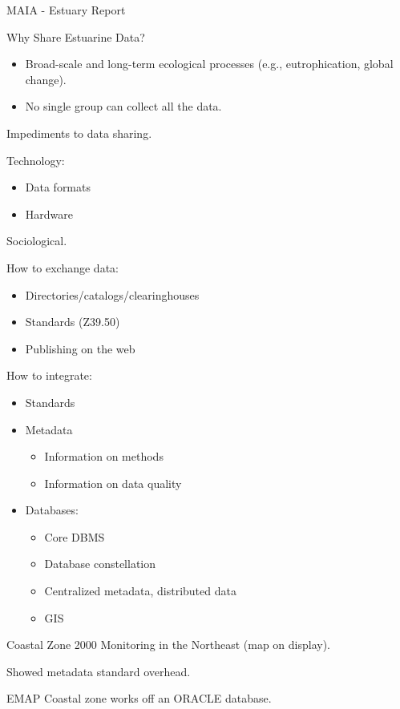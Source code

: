 MAIA - Estuary Report

Why Share Estuarine Data?
\begin{itemize}
\item Broad-scale and long-term ecological processes (e.g.,
  eutrophication, global change).
\item No single group can collect all the data. 
\end{itemize}

Impediments to data sharing.

Technology:
\begin{itemize}
\item Data formats
\item Hardware
\end{itemize}

Sociological.

How to exchange data:
\begin{itemize}
\item Directories/catalogs/clearinghouses
\item Standards (Z39.50)
\item Publishing on the web
\end{itemize}

How to integrate:

\begin{itemize}

\item Standards

\item Metadata
\begin{itemize}
\item Information on methods
\item Information on data quality
\end{itemize}

\item Databases:
\begin{itemize}
\item Core DBMS
\item Database constellation
\item Centralized metadata, distributed data
\item GIS
\end{itemize}
\end{itemize}

Coastal Zone 2000 Monitoring in the Northeast (map on display).

Showed metadata standard overhead.

EMAP Coastal zone works off an ORACLE database.

